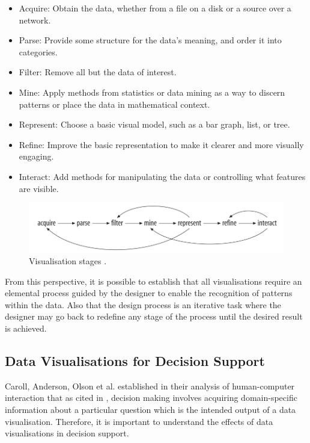\begin{displayquote}
	\begin{itemize}
\item Acquire: Obtain the data, whether from a file on a disk or a source over a network. 
\item Parse: Provide some structure for the data’s meaning, and order it into categories. 
\item Filter: Remove all but the data of interest. 
\item Mine: Apply methods from statistics or data mining as a way to discern patterns or place the data in mathematical context.
\item Represent: Choose a basic visual model, such as a bar graph, list, or tree. 
\item Refine: Improve the basic representation to make it clearer and more visually engaging. 
\item Interact: Add methods for manipulating the data or controlling what features are visible.
\end{itemize}
\end{displayquote}

\begin{figure}[!htb]
\begin{adjustbox}{width=1\textwidth,center=\textwidth}
  \centering
  \includegraphics[scale=1]{images/visualization_stages.png}
\end{adjustbox}
  \caption[Visualisation stages]{Visualisation stages  \cite{Cleveland1993}. }
  \label{fig:data_visualization_stages}
\end{figure}
From this perspective, it is possible to establish that all visualisations require an elemental process guided by the designer to enable the recognition of patterns within the data. Also that the design process is an iterative task where the designer may go back to redefine any stage of the process until the desired result is achieved. 

\subsection{Data Visualisations for Decision Support}
Caroll, Anderson, Olson et al. established in their analysis of human-computer interaction that
 \cite{carroll1987mental} as cited in \cite{Zhu2008}, decision making involves acquiring domain-specific information about a particular question which is the intended output of a data visualisation. Therefore, it is important to understand the effects of data visualisations in decision support.

